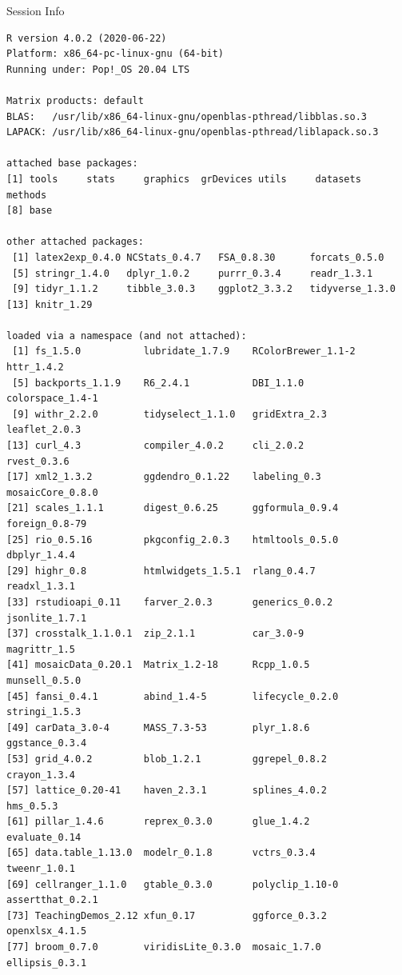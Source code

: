 \documentclass[10pt,handout]{beamer}\usepackage[]{graphicx}\usepackage[]{color}
\makeatletter
\newenvironment{kframe}{%
 \def\at@end@of@kframe{}%
 \ifinner\ifhmode%
  \def\at@end@of@kframe{\end{minipage}}%
  \begin{minipage}{\columnwidth}%
 \fi\fi%
 \def\FrameCommand##1{\hskip\@totalleftmargin \hskip-\fboxsep
 \colorbox{shadecolor}{##1}\hskip-\fboxsep
     \hskip-\linewidth \hskip-\@totalleftmargin \hskip\columnwidth}%
 \MakeFramed {\advance\hsize-\width
   \@totalleftmargin\z@ \linewidth\hsize
   \@setminipage}}%
 {\par\unskip\endMakeFramed%
 \at@end@of@kframe}
\newenvironment{knitrout}{}{} %
\makeatother
\begin{document}
\begin{frame}[fragile]{Session Info}
	\tiny
	
\begin{knitrout}\tiny
{}\color{fgcolor}\begin{kframe}
\begin{verbatim}
R version 4.0.2 (2020-06-22)
Platform: x86_64-pc-linux-gnu (64-bit)
Running under: Pop!_OS 20.04 LTS

Matrix products: default
BLAS:   /usr/lib/x86_64-linux-gnu/openblas-pthread/libblas.so.3
LAPACK: /usr/lib/x86_64-linux-gnu/openblas-pthread/liblapack.so.3

attached base packages:
[1] tools     stats     graphics  grDevices utils     datasets  methods  
[8] base     

other attached packages:
 [1] latex2exp_0.4.0 NCStats_0.4.7   FSA_0.8.30      forcats_0.5.0  
 [5] stringr_1.4.0   dplyr_1.0.2     purrr_0.3.4     readr_1.3.1    
 [9] tidyr_1.1.2     tibble_3.0.3    ggplot2_3.3.2   tidyverse_1.3.0
[13] knitr_1.29     

loaded via a namespace (and not attached):
 [1] fs_1.5.0           lubridate_1.7.9    RColorBrewer_1.1-2 httr_1.4.2        
 [5] backports_1.1.9    R6_2.4.1           DBI_1.1.0          colorspace_1.4-1  
 [9] withr_2.2.0        tidyselect_1.1.0   gridExtra_2.3      leaflet_2.0.3     
[13] curl_4.3           compiler_4.0.2     cli_2.0.2          rvest_0.3.6       
[17] xml2_1.3.2         ggdendro_0.1.22    labeling_0.3       mosaicCore_0.8.0  
[21] scales_1.1.1       digest_0.6.25      ggformula_0.9.4    foreign_0.8-79    
[25] rio_0.5.16         pkgconfig_2.0.3    htmltools_0.5.0    dbplyr_1.4.4      
[29] highr_0.8          htmlwidgets_1.5.1  rlang_0.4.7        readxl_1.3.1      
[33] rstudioapi_0.11    farver_2.0.3       generics_0.0.2     jsonlite_1.7.1    
[37] crosstalk_1.1.0.1  zip_2.1.1          car_3.0-9          magrittr_1.5      
[41] mosaicData_0.20.1  Matrix_1.2-18      Rcpp_1.0.5         munsell_0.5.0     
[45] fansi_0.4.1        abind_1.4-5        lifecycle_0.2.0    stringi_1.5.3     
[49] carData_3.0-4      MASS_7.3-53        plyr_1.8.6         ggstance_0.3.4    
[53] grid_4.0.2         blob_1.2.1         ggrepel_0.8.2      crayon_1.3.4      
[57] lattice_0.20-41    haven_2.3.1        splines_4.0.2      hms_0.5.3         
[61] pillar_1.4.6       reprex_0.3.0       glue_1.4.2         evaluate_0.14     
[65] data.table_1.13.0  modelr_0.1.8       vctrs_0.3.4        tweenr_1.0.1      
[69] cellranger_1.1.0   gtable_0.3.0       polyclip_1.10-0    assertthat_0.2.1  
[73] TeachingDemos_2.12 xfun_0.17          ggforce_0.3.2      openxlsx_4.1.5    
[77] broom_0.7.0        viridisLite_0.3.0  mosaic_1.7.0       ellipsis_0.3.1    
\end{verbatim}
\end{kframe}
\end{knitrout}
	
\end{frame}
\end{document}
